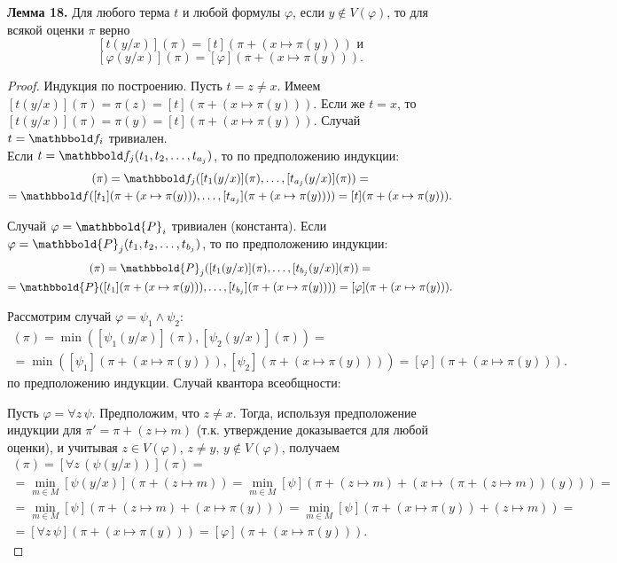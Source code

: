 \documentclass[a4paper, fleqn]{article}
\begin{document}
    \textbf{Лемма 18. } Для любого терма $t$ и любой формулы $\varphi$, если $y \not\in V(\varphi)$, то для всякой оценки $\pi$ верно
    \[ [t(y/x)](\pi) = [t](\pi + (x \mapsto \pi(y))) \text{ и} \]
    \[ [\varphi(y/x)](\pi) = [\varphi](\pi + (x \mapsto \pi(y))). \]
    
    \begin{proof}
        Индукция по построению. Пусть $t = z \ne x$. Имеем $[t(y/x)](\pi) = \pi(z) = [t](\pi + (x \mapsto \pi(y)))$. Если же $t = x$, то $[t(y/x)](\pi) = \pi(y) = [t](\pi + (x \mapsto \pi(y)))$. Случай $t = \F_i$ тривиален.\\[-10 pt]
    
    Если $t = \F_j(t_1, t_2, \ldots, t_{a_j})$, то по предположению индукции:
    \begin{multline*}
    [t(y/x)](\pi) = \F_j([t_1(y/x)](\pi), \ldots, [t_{a_j}(y/x)](\pi)) = \\
    = \F([t_1](\pi + (x \mapsto \pi(y))), \ldots, [t_{a_j}](\pi + (x \mapsto \pi(y)))) = [t](\pi + (x \mapsto \pi(y))).
    \end{multline*}
    
    Случай $\varphi = \mathbbold{P}_i$ тривиален (константа). Если $\varphi = \mathbbold{P}_j(t_1, t_2, \ldots, t_{b_j})$, то по предположению индукции:
    \begin{multline*}
    [\varphi(y/x)](\pi) = \mathbbold{P}_j([t_1(y/x)](\pi), \ldots, [t_{b_j}(y/x)](\pi)) = \\
    = \mathbbold{P}([t_1](\pi + (x \mapsto \pi(y))), \ldots, [t_{b_j}](\pi + (x \mapsto \pi(y)))) = [\varphi](\pi + (x \mapsto \pi(y))).
    \end{multline*}
    
    Рассмотрим случай $\varphi = \psi_1 \wedge \psi_2$:
    \begin{multline*}
    [\varphi(y/x)](\pi) = \min([\psi_1(y/x)](\pi), [\psi_2(y/x)](\pi)) = \\
    = \min([\psi_1](\pi + (x \mapsto \pi(y))), [\psi_2](\pi + (x \mapsto \pi(y)))) = [\varphi](\pi + (x \mapsto \pi(y))).
    \end{multline*}
    по предположению индукции. Случай квантора всеобщности:
    
    Пусть $\varphi = \forall z\, \psi$. Предположим, что $z \ne x$. Тогда, используя предположение индукции для $\pi' = \pi + (z \mapsto m)$ (т.к. утверждение доказывается для любой оценки), и учитывая $z \in V(\varphi), \, z \ne y, \, y \not\in V(\varphi)$, получаем
    \begin{multline*}
    [\varphi(y/x)](\pi) = [\forall z\,(\psi(y/x))](\pi) = \\
    = \underset{m \in M}{\min}[\psi(y/x)](\pi + (z \mapsto m)) =
    \underset{m \in M}{\min}[\psi](\pi + (z \mapsto m) + (x \mapsto (\pi + (z \mapsto m))(y))) = \\
    = \underset{m \in M}{\min}[\psi](\pi + (z \mapsto m) + (x \mapsto \pi(y))) = 
    \underset{m \in M}{\min}[\psi](\pi + (x \mapsto \pi(y)) + (z \mapsto m)) = \\
    = [\forall z\, \psi](\pi + (x \mapsto \pi(y))) = [\varphi](\pi + (x \mapsto \pi(y))).
    \end{multline*}
    

\end{proof}
\end{document}
